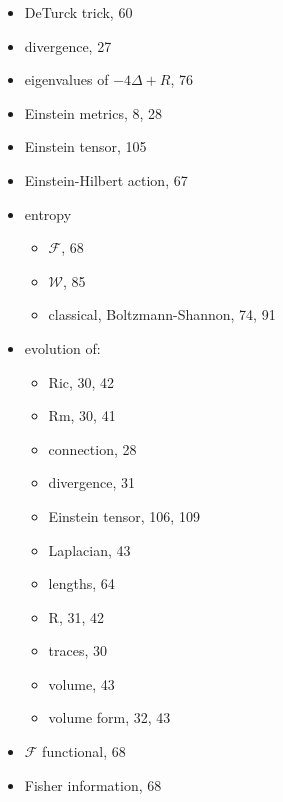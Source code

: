\begin{itemize}
\begin{itemize}
\item preserved conditions, 47
    \begin{itemize}
    \item positive Ricci curvature, 118
    \item positive sectional curvature, 117
    \end{itemize}
\item tensor, 25
\end{itemize}
\item DeTurck trick, 60
\item divergence, 27
\item eigenvalues of $-4\Delta + R$, 76
\item Einstein metrics, 8, 28
\item Einstein tensor, 105
\item Einstein-Hilbert action, 67
\item entropy
\begin{itemize}
\item $\mathcal{F}$, 68
\item $\mathcal{W}$, 85
\item classical, Boltzmann-Shannon, 74, 91
\end{itemize}
\item evolution of:
\begin{itemize}
\item Ric, 30, 42
\item Rm, 30, 41
\item connection, 28
\item divergence, 31
\item Einstein tensor, 106, 109
\item Laplacian, 43
\item lengths, 64
\item R, 31, 42
\item traces, 30
\item volume, 43
\item volume form, 32, 43
\end{itemize}
\item $\mathcal{F}$ functional, 68
\item Fisher information, 68


\end{itemize}
